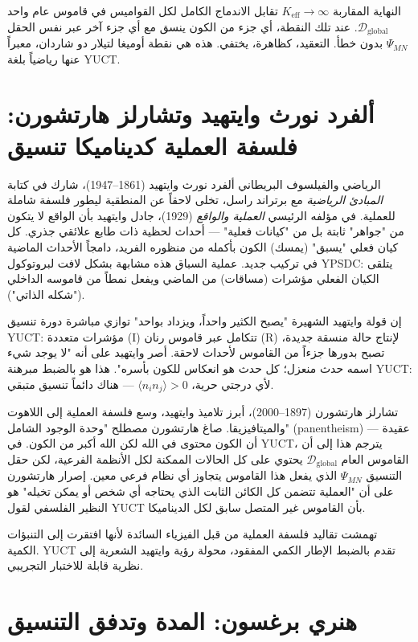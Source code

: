 \documentclass[12pt,a4paper]{article}
\newcommand{\Keff}{K_{\mathrm{eff}}}
\begin{document}
	النهاية المقاربة \(\Keff \to \infty\) تقابل الاندماج الكامل لكل القواميس في قاموس عام واحد \(\mathcal{D}_{\text{global}}\). عند تلك النقطة، أي جزء من الكون ينسق مع أي جزء آخر عبر نفس الحقل \(\Psi_{MN}\) بدون خطأ. التعقيد، كظاهرة، يختفي. هذه هي نقطة أوميغا لتيلار دو شاردان، معبراً عنها رياضياً بلغة YUCT.
	
	\section{ألفرد نورث وايتهيد وتشارلز هارتشورن: فلسفة العملية كديناميكا تنسيق}
	
	الرياضي والفيلسوف البريطاني ألفرد نورث وايتهيد (1861–1947)، شارك في كتابة \emph{المبادئ الرياضية} مع برتراند راسل، تخلى لاحقاً عن المنطقية ليطور فلسفة شاملة للعملية. في مؤلفه الرئيسي \emph{العملية والواقع} (1929)، جادل وايتهيد بأن الواقع لا يتكون من "جواهر" ثابتة بل من "كيانات فعلية" — أحداث لحظية ذات طابع علائقي جذري. كل كيان فعلي "يسبق" (يمسك) الكون بأكمله من منظوره الفريد، دامجاً الأحداث الماضية في تركيب جديد. عملية السباق هذه مشابهة بشكل لافت لبروتوكول YPSDC: يتلقى الكيان الفعلي مؤشرات (مساقات) من الماضي ويفعل نمطاً من قاموسه الداخلي ("شكله الذاتي").
	
	إن قولة وايتهيد الشهيرة "يصبح الكثير واحداً، ويزداد بواحد" توازي مباشرة دورة تنسيق YUCT: مؤشرات متعددة (I) تتكامل عبر قاموس رنان (R) لإنتاج حالة منسقة جديدة، تصبح بدورها جزءاً من القاموس لأحداث لاحقة. أصر وايتهيد على أنه "لا يوجد شيء اسمه حدث منعزل؛ كل حدث هو انعكاس للكون بأسره". هذا هو بالضبط مبرهنة YUCT: لأي درجتي حرية، \(\langle n_i n_j \rangle > 0\) — هناك دائماً تنسيق متبقي.
	
	تشارلز هارتشورن (1897–2000)، أبرز تلاميذ وايتهيد، وسع فلسفة العملية إلى اللاهوت والميتافيزيقا. صاغ هارتشورن مصطلح "وحدة الوجود الشامل" (panentheism) — عقيدة أن الكون محتوى في الله لكن الله أكبر من الكون. في YUCT، يترجم هذا إلى أن القاموس العام \(\mathcal{D}_{\text{global}}\) يحتوي على كل الحالات الممكنة لكل الأنظمة الفرعية، لكن حقل التنسيق \(\Psi_{MN}\) الذي يفعل هذا القاموس يتجاوز أي نظام فرعي معين. إصرار هارتشورن على أن "العملية تتضمن كل الكائن الثابت الذي يحتاجه أي شخص أو يمكن تخيله" هو النظير الفلسفي لقول YUCT بأن القاموس غير المتصل سابق لكل الديناميكا.
	
	تهمشت تقاليد فلسفة العملية من قبل الفيزياء السائدة لأنها افتقرت إلى التنبؤات الكمية. YUCT تقدم بالضبط الإطار الكمي المفقود، محولة رؤية وايتهيد الشعرية إلى نظرية قابلة للاختبار التجريبي.
	
	\section{هنري برغسون: المدة وتدفق التنسيق}
	
\end{document}
